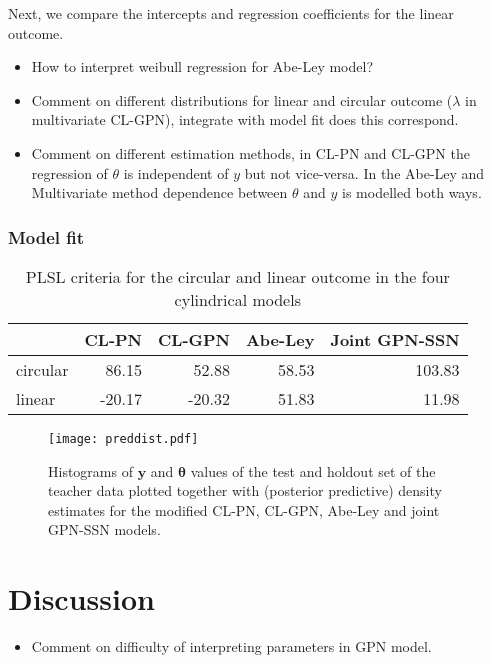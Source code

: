 \documentclass[11pt,]{article}
\begin{document}
Next, we compare the intercepts and regression coefficients for the
linear outcome.

\begin{itemize}
\item How to interpret weibull regression for Abe-Ley model?
\item Comment on different distributions for linear and circular outcome ($\lambda$ in multivariate CL-GPN), integrate with model fit does this correspond. 
\item Comment on different estimation methods, in CL-PN and CL-GPN the regression of $\theta$ is independent of $y$ but not vice-versa. In the Abe-Ley and Multivariate method dependence between $\theta$ and $y$ is modelled both ways. 
\end{itemize}

\subsubsection{Model fit}

\begin{table}

\caption{\label{tab:ModelFit}PLSL criteria for the circular and linear outcome in the four cylindrical models}
\centering
\begin{tabular}[t]{lrrrr}
\toprule
  & CL-PN & CL-GPN & Abe-Ley & Joint GPN-SSN\\
\midrule
circular & 86.15 & 52.88 & 58.53 & 103.83\\
linear & -20.17 & -20.32 & 51.83 & 11.98\\
\bottomrule
\end{tabular}
\end{table}

\begin{figure}
\centering
\texttt{[image: preddist.pdf]}
\caption{Histograms of $\boldsymbol{y}$ and $\boldsymbol{\theta}$ values of the test and holdout set of the teacher data plotted together with (posterior predictive) density estimates for the modified CL-PN, CL-GPN, Abe-Ley and joint GPN-SSN models.}
\label{preddist}
\end{figure}

\section{Discussion}\label{Discussion}

\begin{itemize}
\item Comment on difficulty of interpreting parameters in GPN model.
\end{itemize}
\end{document}
